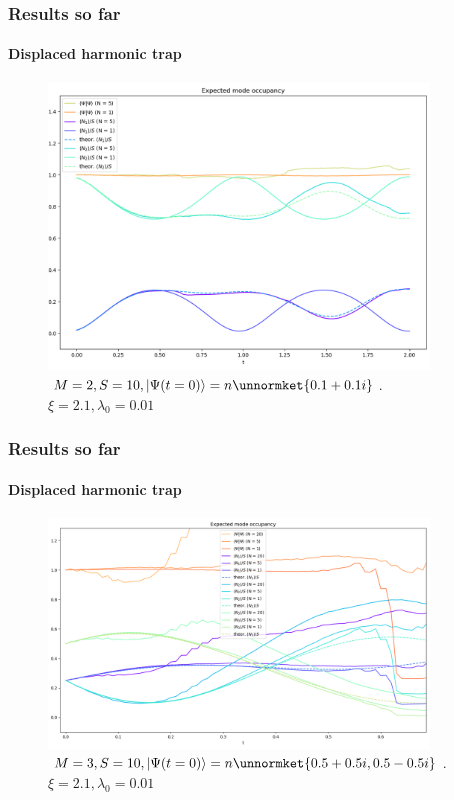 \documentclass[english]{beamer}
\begin{document}
  \begin{frame}
  	\frametitle{Results so far}
  	\framesubtitle{Displaced harmonic trap}
  	\begin{figure}
	\centering
    		\includegraphics[width=0.9\textwidth]{images/DHT_M=2}
    		\caption{$M=2, S=10, \ket{\Psi(t=0)}=n\unnormket{0.1+0.1i}$. $\xi=2.1, \lambda_0=0.01$}
    		\label{fig:DHT2}
	\end{figure}
  \end{frame}
  
  \begin{frame}
  	\frametitle{Results so far}
  	\framesubtitle{Displaced harmonic trap}
  	\begin{figure}
	\centering
    		\includegraphics[width=0.9\textwidth]{images/DHT_M=3}
    		\caption{$M=3, S=10, \ket{\Psi(t=0)}=n\unnormket{0.5+0.5i,0.5-0.5i}$. $\xi=2.1, \lambda_0=0.01$}
    		\label{fig:DHT3}
	\end{figure}
  \end{frame}
  
\end{document}
